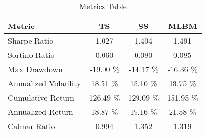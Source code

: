 \begin{table}[H]
\centering
\begin{tabular}{lccc}
\toprule
Metric & TS & SS & MLBM \\
\midrule
Sharpe Ratio & 1.027 & 1.404 & 1.491 \\
Sortino Ratio & 0.060 & 0.080 & 0.085 \\
Max Drawdown & -19.00 \% & -14.17 \% & -16.36 \% \\
Annualized Volatility & 18.51 \% & 13.10 \% & 13.75 \% \\
Cumulative Return & 126.49 \% & 129.09 \% & 151.95 \% \\
Annualized Return & 18.87 \% & 19.16 \% & 21.58 \% \\
Calmar Ratio & 0.994 & 1.352 & 1.319 \\
\bottomrule
\end{tabular}
\caption{Metrics Table}
\label{tab:metrics_table}
\end{table}
